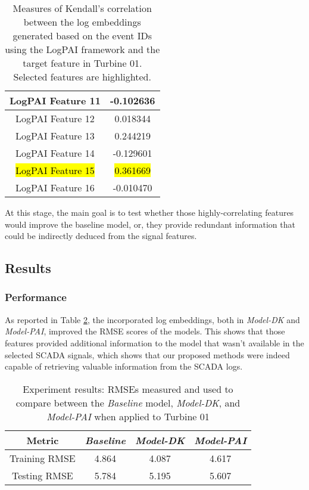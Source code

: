 \begin{table}[H]
{\begin{tabular}{|c|c|}
        \hline
        \multicolumn{1}{|m{0.25\textwidth}|}{LogPAI Feature 11} & -0.102636\\
        \hline
        \multicolumn{1}{|m{0.25\textwidth}|}{LogPAI Feature 12} & 0.018344\\
        \hline
        \multicolumn{1}{|m{0.25\textwidth}|}{LogPAI Feature 13} & 0.244219\\
        \hline
        \multicolumn{1}{|m{0.25\textwidth}|}{LogPAI Feature 14} & -0.129601\\
        \hline
        \multicolumn{1}{|m{0.25\textwidth}|}{\hl{LogPAI Feature 15}} & \hl{0.361669}\\
        \hline
        \multicolumn{1}{|m{0.25\textwidth}|}{LogPAI Feature 16} & -0.010470\\
        \hline
    \end{tabular}
    \caption{Measures of Kendall's correlation between the log embeddings generated based on the event IDs using the LogPAI framework and the target feature in Turbine 01. Selected features are highlighted.}
    \label{tab:expII:logpai-feats}
    }
    \end{table}

At this stage, the main goal is to test whether those highly-correlating features would improve the baseline model, or, 
they provide redundant information that could be indirectly deduced from the signal features.

\subsection{Results}
\subsubsection{Performance}
As reported in Table \ref{tab:Experiment II results}, the incorporated log embeddings, both in \emph{Model-DK} and \emph{Model-PAI}, improved the RMSE scores of the models. 
This shows that those features provided additional information to the model that wasn't available in the selected SCADA signals, which shows that our proposed methods 
were indeed capable of retrieving valuable information from the SCADA logs.

\begin{table}[H]
    \centering
\begin{tabular}{|c|c|c|c|}
\hline
     \textbf{Metric} & \textbf{\emph{Baseline}} & \textbf{\emph{Model-DK}} & \textbf{\emph{Model-PAI}}\\
     \hline
     Training RMSE & 4.864 & 4.087 & 4.617\\
     \hline
     Testing RMSE & 5.784 & 5.195 & 5.607\\
\hline
\end{tabular}
\caption{Experiment results: RMSEs measured and used to compare between the \emph{Baseline} model, \emph{Model-DK}, and \emph{Model-PAI} when applied to Turbine 01}
    \label{tab:Experiment II results}
\end{table}

